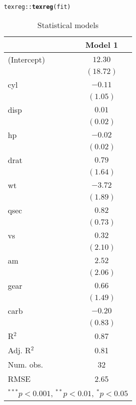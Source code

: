 \documentclass[]{article}\usepackage[]{graphicx}\usepackage[]{color}
\makeatletter
\newcommand{\hlopt}[1]{\textcolor[rgb]{0,0,0}{#1}}%
\newcommand{\hlstd}[1]{\textcolor[rgb]{0.345,0.345,0.345}{#1}}%
\newcommand{\hlkwd}[1]{\textcolor[rgb]{0.737,0.353,0.396}{\textbf{#1}}}%
\newenvironment{kframe}{%
 \def\at@end@of@kframe{}%
 \ifinner\ifhmode%
  \def\at@end@of@kframe{\end{minipage}}%
  \begin{minipage}{\columnwidth}%
 \fi\fi%
 \def\FrameCommand##1{\hskip\@totalleftmargin \hskip-\fboxsep
 \colorbox{shadecolor}{##1}\hskip-\fboxsep
     \hskip-\linewidth \hskip-\@totalleftmargin \hskip\columnwidth}%
 \MakeFramed {\advance\hsize-\width
   \@totalleftmargin\z@ \linewidth\hsize
   \@setminipage}}%
 {\par\unskip\endMakeFramed%
 \at@end@of@kframe}
\makeatother
\begin{document}
\newpage

\begin{kframe}
\begin{alltt}
\hlstd{texreg}\hlopt{::}\hlkwd{texreg}\hlstd{(fit)}
\end{alltt}
\end{kframe}
\begin{table}
\begin{center}
\begin{tabular}{l c }
\hline
 & Model 1 \\
\hline
(Intercept) & $12.30$   \\
            & $(18.72)$ \\
cyl         & $-0.11$   \\
            & $(1.05)$  \\
disp        & $0.01$    \\
            & $(0.02)$  \\
hp          & $-0.02$   \\
            & $(0.02)$  \\
drat        & $0.79$    \\
            & $(1.64)$  \\
wt          & $-3.72$   \\
            & $(1.89)$  \\
qsec        & $0.82$    \\
            & $(0.73)$  \\
vs          & $0.32$    \\
            & $(2.10)$  \\
am          & $2.52$    \\
            & $(2.06)$  \\
gear        & $0.66$    \\
            & $(1.49)$  \\
carb        & $-0.20$   \\
            & $(0.83)$  \\
\hline
R$^2$       & 0.87      \\
Adj. R$^2$  & 0.81      \\
Num. obs.   & 32        \\
RMSE        & 2.65      \\
\hline
\multicolumn{2}{l}{\scriptsize{$^{***}p<0.001$, $^{**}p<0.01$, $^*p<0.05$}}
\end{tabular}
\caption{Statistical models}
\label{table:coefficients}
\end{center}
\end{table}




\end{document}
